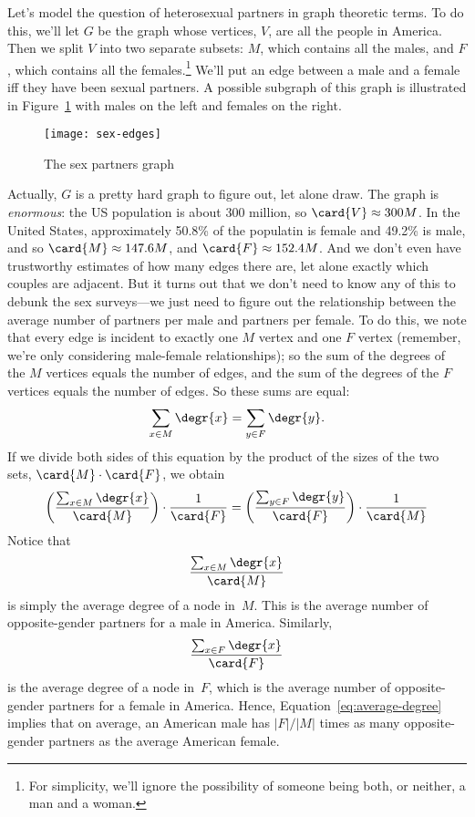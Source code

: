 Let's model the question of heterosexual partners in graph theoretic
terms.  To do this, we'll let $G$ be the graph whose vertices, $V$,
are all the people in America.  Then we split $V$ into two separate
subsets: $M$, which contains all the males, and $F$, which contains
all the females.\footnote{For simplicity, we'll ignore the possibility
  of someone being both, or neither, a man and a woman.}  We'll put an
edge between a male and a female iff they have been sexual partners.
A possible subgraph of this graph is illustrated in
Figure~\ref{fig:partners} with males on the left and females on the
right.

\begin{figure}[htbp]
\texttt{[image: sex-edges]}
\caption{The sex partners graph}
\label{fig:partners}
\end{figure}

Actually, $G$ is a pretty hard graph to figure out, let alone draw.
The graph is \emph{enormous}: the US population is about 300 million,
so $\card{V} \approx 300M$.  In the United States, approximately
50.8\% of the populatin is female and 49.2\% is male, and so $\card{M}
\approx 147.6M$, and $\card{F} \approx 152.4M$.  And we don't even
have trustworthy estimates of how many edges there are, let alone
exactly which couples are adjacent.  But it turns out that we don't
need to know any of this to debunk the sex surveys---we just need to
figure out the relationship between the average number of partners per
male and partners per female.  To do this, we note that every edge is
incident to exactly one $M$ vertex and one $F$ vertex (remember, we're
only considering male-female relationships); so the sum of the degrees
of the $M$ vertices equals the number of edges, and the sum of the
degrees of the $F$ vertices equals the number of edges.  So these sums
are equal:
%
\[
\sum_{x \in M} \degr{x} = \sum_{y \in F} \degr{y}.
\]
%
If we divide both sides of this equation by the product of the sizes
of the two sets, $\card{M} \cdot \card{F}$, we obtain
%
\begin{equation}\label{eq:average-degree}
\left(\frac{\sum_{x \in M} \degr{x}}{\card{M}}\right) \cdot \frac{1}{\card{F}} =
\left(\frac{\sum_{y \in F} \degr{y}}{\card{F}}\right) \cdot \frac{1}{\card{M}}
\end{equation}
Notice that
\begin{equation*}
    \frac{\sum_{x \in M} \degr{x}}{\card{M}}
\end{equation*}
is simply the average degree of a node in~$M$.  This is the average
number of opposite-gender partners for a male in America.  Similarly,
\begin{equation*}
    \frac{\sum_{x \in F} \degr{x}}{\card{F}}
\end{equation*}
is the average degree of a node in~$F$, which is the average number of
opposite-gender partners for a female in America.  Hence,
Equation~\ref{eq:average-degree} implies that on average, an American
male has $|F|/|M|$ times as many opposite-gender partners as the
average American female.

